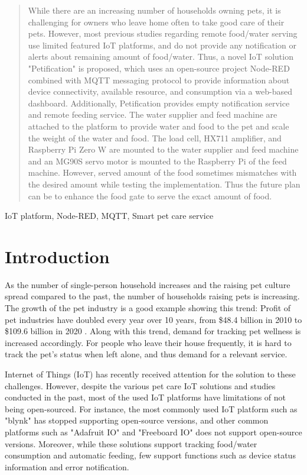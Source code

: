 ﻿\documentclass[conference]{IEEEtran}
\begin{document}
\begin{abstract}
While there are an increasing number of households owning pets, it is challenging for owners who leave home often to take good care of their pets.
However, most previous studies regarding remote food/water serving use limited featured IoT platforms, and do not provide any notification or alerts about remaining amount of food/water.
Thus, a novel IoT solution "Petification" is proposed, which uses an open-source project Node-RED combined with MQTT messaging protocol to provide information about device connectivity, available resource, and consumption via a web-based dashboard.
Additionally, Petification provides empty notification service and remote feeding service.
The water supplier and feed machine are attached to the platform to provide water and food to the pet and scale the weight of the water and food.
The load cell, HX711 amplifier, and Raspberry Pi Zero W are mounted to the water supplier and feed machine and an MG90S servo motor is mounted to the Raspberry Pi of the feed machine.
However, served amount of the food sometimes mismatches with the desired amount while testing the implementation.
Thus the future plan can be to enhance the food gate to serve the exact amount of food. \\
\end{abstract}

\begin{IEEEkeywords}
IoT platform, Node-RED, MQTT, Smart pet care service 
\end{IEEEkeywords}

\section{Introduction}
As the number of single-person household increases and the raising pet culture spread compared to the past, the number of households raising pets is increasing.
The growth of the pet industry is a good example showing this trend: Profit of pet industries have doubled every year over 10 years, from \$48.4 billion in 2010 to \$109.6 billion in 2020 \cite{b1}.
Along with this trend, demand for tracking pet wellness is increased accordingly.
For people who leave their house frequently, it is hard to track the pet's status when left alone, and thus demand for a relevant service.

Internet of Things (IoT) has recently received attention for the solution to these challenges.
However, despite the various pet care IoT solutions and studies conducted in the past, most of the used IoT platforms have limitations of not being open-sourced.
For instance, the most commonly used IoT platform such as "blynk" \cite{b2, b3, b4} has stopped supporting open-source versions, and other common platforms such as "Adafruit IO" \cite{b5} and "Freeboard IO" \cite{b6} does not support open-source versions. 
Moreover, while these solutions support tracking food/water consumption and automatic feeding, few support functions such as device status information and error notification.
\end{document}
